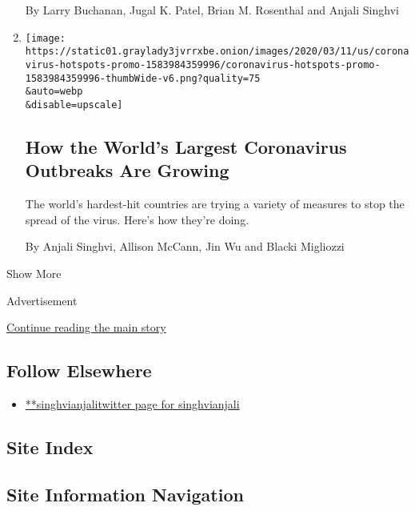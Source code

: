 \begin{enumerate}
  By Larry Buchanan, Jugal K. Patel, Brian M. Rosenthal and Anjali
  Singhvi
\item
  \href{/interactive/2020/world/coronavirus-maps-italy-iran-korea.html}{}

  \texttt{[image: https://static01.graylady3jvrrxbe.onion/images/2020/03/11/us/coronavirus-hotspots-promo-1583984359996/coronavirus-hotspots-promo-1583984359996-thumbWide-v6.png?quality=75\\\&auto=webp\\\&disable=upscale]}

  \hypertarget{how-the-worlds-largest-coronavirus-outbreaks-are-growing}{%
  \subsection{How the World's Largest Coronavirus Outbreaks Are
  Growing}\label{how-the-worlds-largest-coronavirus-outbreaks-are-growing}}

  The world's hardest-hit countries are trying a variety of measures to
  stop the spread of the virus. Here's how they're doing.

  By Anjali Singhvi, Allison McCann, Jin Wu and Blacki Migliozzi
\end{enumerate}

Show More

Advertisement

\protect\hyperlink{after-mid2}{Continue reading the main story}

\hypertarget{follow-elsewhere}{%
\subsection{Follow Elsewhere}\label{follow-elsewhere}}

\begin{itemize}
\tightlist
\item
  \href{https://twitter.com/singhvianjali}{**singhvianjalitwitter page
  for singhvianjali}
\end{itemize}

\hypertarget{site-index}{%
\subsection{Site Index}\label{site-index}}

\hypertarget{site-information-navigation}{%
\subsection{Site Information
Navigation}\label{site-information-navigation}}

